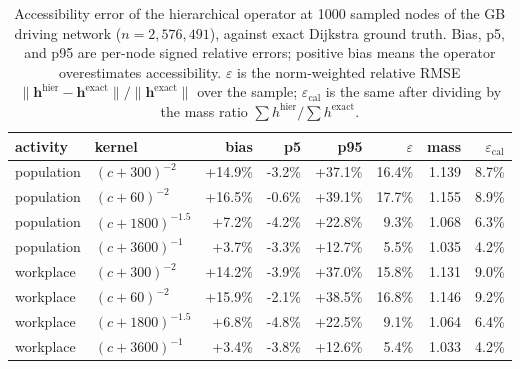 \begin{table}[t]
\centering
\caption{Accessibility error of the hierarchical operator at 1000 sampled nodes of the GB driving network ($n = 2{,}576{,}491$), against exact Dijkstra ground truth. Bias, p5, and p95 are per-node signed relative errors; positive bias means the operator overestimates accessibility. $\varepsilon$ is the norm-weighted relative RMSE $\|\mathbf{h}^{\mathrm{hier}} - \mathbf{h}^{\mathrm{exact}}\| / \|\mathbf{h}^{\mathrm{exact}}\|$ over the sample; $\varepsilon_{\mathrm{cal}}$ is the same after dividing by the mass ratio $\sum h^{\mathrm{hier}} / \sum h^{\mathrm{exact}}$.}
\label{tab:si-error-anatomy-kernels}
\begin{tabular}{llrrrrrr}
\toprule
activity & kernel & bias & p5 & p95 & $\varepsilon$ & mass & $\varepsilon_{\mathrm{cal}}$ \\
\midrule
population & $(c+300)^{-2}$ & +14.9\% & -3.2\% & +37.1\% & 16.4\% & 1.139 & 8.7\% \\
population & $(c+60)^{-2}$ & +16.5\% & -0.6\% & +39.1\% & 17.7\% & 1.155 & 8.9\% \\
population & $(c+1800)^{-1.5}$ & +7.2\% & -4.2\% & +22.8\% & 9.3\% & 1.068 & 6.3\% \\
population & $(c+3600)^{-1}$ & +3.7\% & -3.3\% & +12.7\% & 5.5\% & 1.035 & 4.2\% \\
workplace & $(c+300)^{-2}$ & +14.2\% & -3.9\% & +37.0\% & 15.8\% & 1.131 & 9.0\% \\
workplace & $(c+60)^{-2}$ & +15.9\% & -2.1\% & +38.5\% & 16.8\% & 1.146 & 9.2\% \\
workplace & $(c+1800)^{-1.5}$ & +6.8\% & -4.8\% & +22.5\% & 9.1\% & 1.064 & 6.4\% \\
workplace & $(c+3600)^{-1}$ & +3.4\% & -3.8\% & +12.6\% & 5.4\% & 1.033 & 4.2\% \\
\bottomrule
\end{tabular}
\end{table}
